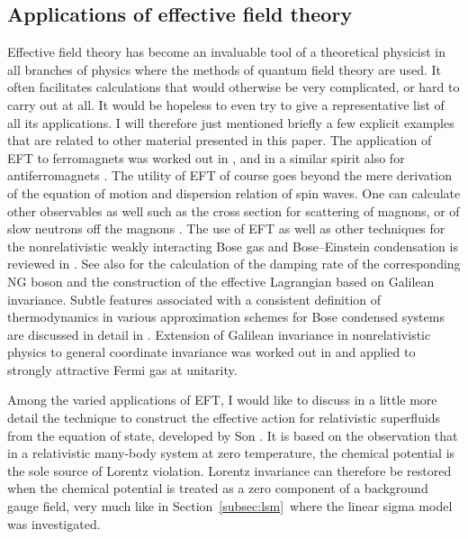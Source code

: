 \documentclass[final,3p,times,12pt,a4paper,sort&compress]{elsarticle}
\begin{document}
\subsection{Applications of effective field theory}
Effective field theory has become an invaluable tool of a theoretical physicist
in all branches of physics where the methods of quantum field theory are used.
It often facilitates calculations that would otherwise be very complicated, or
hard to carry out at all. It would be hopeless to even try to give a
representative list of all its applications. I will therefore just mentioned
briefly a few explicit examples that are related to other material presented
in this paper. The application of EFT to ferromagnets was worked out in
\cite{Leutwyler:1993gf,Roman:1999ro,Hofmann:1998pp,Hofmann:2001ck}, and
in a similar spirit also for antiferromagnets
\cite{Hofmann:1997qm,Kampfer:2005ba,Brugger:2006dz,Hofmann:2009ru}. The utility
of EFT of course goes beyond the mere derivation of the equation of motion and
dispersion relation of spin waves. One can calculate other observables as well
such as the cross section for scattering of magnons, or of slow neutrons off the
magnons \cite{Burgess:1998ku}. The use of EFT as well as other techniques for
the nonrelativistic weakly interacting Bose gas and Bose--Einstein condensation
is reviewed in \cite{Andersen:2003qj}. See also \cite{Andersen:2002nd} for the
calculation of the damping rate of the corresponding NG boson and the
construction of the effective Lagrangian based on Galilean invariance. Subtle
features associated with a consistent definition of thermodynamics in various
approximation schemes for Bose condensed systems are discussed in detail in
\cite{Yukalov:2008yu}. Extension of Galilean invariance in nonrelativistic
physics to general coordinate invariance was worked out in \cite{Son:2005rv}
and applied to strongly attractive Fermi gas at unitarity.

Among the varied applications of EFT, I would like to discuss in a little
more detail the technique to construct the effective action for relativistic
superfluids from the equation of state, developed by Son \cite{Son:2002zn}. It
is based on the observation that in a relativistic many-body system at zero
temperature, the chemical potential is the sole source of Lorentz violation.
Lorentz invariance can therefore be restored when the chemical potential is
treated as a zero component of a background gauge field, very much like in
Section~\ref{subsec:lsm}\ where the linear sigma model was investigated.
\end{document}
